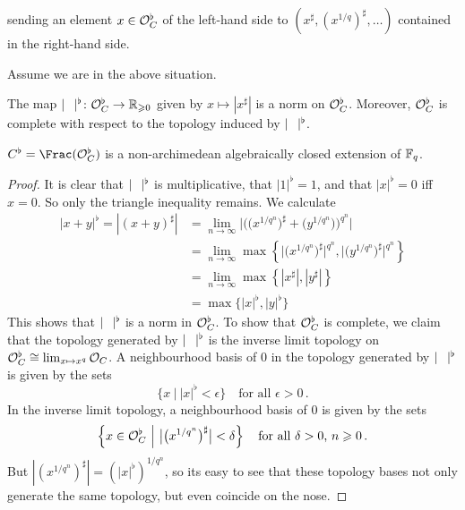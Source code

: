 sending an element $x\in \mathcal{O}_C^\flat$ of the left-hand side to $(x^\sharp, (x^{1/q})^\sharp,\dotsc)$ contained in the right-hand side.
\begin{lem}\label{lem:OcflatisOF}
	Assume we are in the above situation.
	\begin{numerate}
		\item The map $|\blank|^\flat\colon \Oo_C^\flat\morphism\IR_{\geq 0}$ given by $x\mapsto |x^\sharp|$ is a norm on $\mathcal{O}_C^\flat$. Moreover, $\mathcal{O}_C^\flat$ is complete with respect to the topology induced by $|\blank|^\flat$.
		\item $C^\flat=\Frac(\Oo_C^\flat)$ is a non-archimedean algebraically closed extension of $\mathbb{F}_q$.
	\end{numerate}
\end{lem}
\begin{proof}
	It is clear that $|\blank|^\flat$ is multiplicative, that $|1|^\flat=1$, and that $|x|^\flat=0$ iff $x=0$. So only the triangle inequality remains. We calculate
	\begin{align*}
		|x+y|^\flat=|(x+y)^\sharp|&=\lim_{n\to\infty}\bigg|\Big(\big(x^{1/q^n}\big)^\sharp+\big(y^{1/q^n}\big)\Big)^{q^n}\bigg|\\
		&=\lim_{n\to\infty}\max\left\{\big|\big(x^{1/q^n}\big)^\sharp\big|^{q^n},\big|\big(y^{1/q^n}\big)^\sharp\big|^{q^n}\right\}\\
		&=\lim_{n\to\infty}\max\left\{|x^\sharp|,|y^\sharp|\right\}\\
		&=\max\big\{|x|^\flat,|y|^\flat\big\}
	\end{align*}
	This shows that $|\blank|^\flat$ is a norm in $\mathcal{O}_C^\flat$. To show that $\mathcal{O}_C^\flat$ is complete, we claim that the topology generated by $|\blank|^\flat$ is the inverse limit topology on $\mathcal{O}_C^\flat\cong \lim_{x\mapsto x^q}\mathcal{O}_C$. A neighbourhood basis of $0$ in the topology generated by $|\blank|^\flat$ is given by the sets
	\begin{equation*}
		\big\{x\ \big|\ |x|^\flat<\epsilon\big\}\quad\text{for all }\epsilon>0\,.
	\end{equation*}
	In the inverse limit topology, a neighbourhood basis of $0$ is given by the sets
	\begin{equation*}
		\left\{x\in \mathcal{O}_C^\flat\ \middle|\  \big|\big(x^{1/q^n}\big)^\sharp\big|<\delta\right\}\quad\text{for all }\delta>0\text{, }n\geqslant 0\,.
	\end{equation*}
	But $|(x^{1/q^n})^\sharp|=(|x|^\flat)^{1/q^n}$, so its easy to see that these topology bases not only generate the same topology, but even coincide on the nose.
	

\end{proof}
